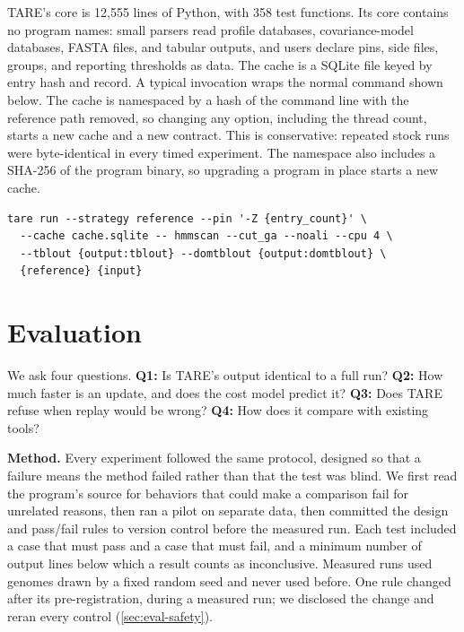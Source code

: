 \documentclass[letterpaper,twocolumn,10pt]{article}
\theoremstyle{definition}
\newcommand{\sys}{TARE\xspace}
\newcommand{\sys}{PARE\xspace}
\begin{document}
\sys's core is 12{,}555 lines of Python, with 358 test functions. Its core contains no program names: small parsers read
profile databases, covariance\nobreakdash-model databases, FASTA files, and tabular outputs, and users declare pins, side files,
groups, and reporting thresholds as data. The cache is a SQLite file keyed by entry hash and record. A typical
invocation wraps the normal command shown below. The cache is namespaced by a hash of the command line with the
reference path removed, so changing any option, including the thread count, starts a new cache and a new contract.
This is conservative: repeated stock runs were byte\nobreakdash-identical in every timed experiment. The
namespace also includes a SHA-256 of the program binary, so upgrading a program in place starts a new cache.
\begin{lstlisting}
tare run --strategy reference --pin '-Z {entry_count}' \
  --cache cache.sqlite -- hmmscan --cut_ga --noali --cpu 4 \
  --tblout {output:tblout} --domtblout {output:domtblout} \
  {reference} {input}
\end{lstlisting}

\section{Evaluation}
\label{sec:eval}

We ask four questions. \textbf{Q1:} Is \sys's output identical to a full run? \textbf{Q2:} How much faster is an
update, and does the cost model predict it? \textbf{Q3:} Does \sys refuse when replay would be wrong? \textbf{Q4:} How
does it compare with existing tools?

\textbf{Method.} Every experiment followed the same protocol, designed so that a failure means the method failed rather
than that the test was blind. We first read the program's source for behaviors that could make a comparison fail for
unrelated reasons, then ran a pilot on separate data, then committed the design and pass/fail rules to version control
before the measured run. Each test included a case that must pass and a case that must fail, and a minimum number of
output lines below which a result counts as inconclusive. Measured runs used genomes drawn by a fixed random seed and
never used before. One rule changed after its pre\nobreakdash-registration, during a measured run; we disclosed the change and
reran every control (\cref{sec:eval-safety}).
\end{document}
